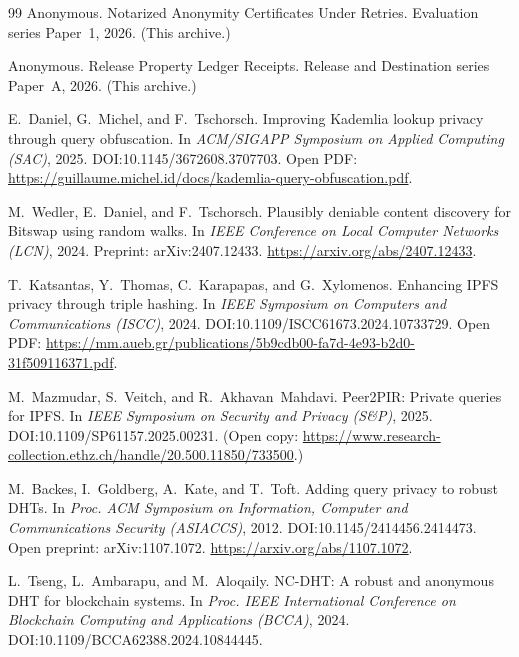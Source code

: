 \documentclass[11pt]{article}
\begin{document}
\begin{thebibliography}{99}
Anonymous.
\newblock Notarized Anonymity Certificates Under Retries.
\newblock Evaluation series Paper~1, 2026. (This archive.)

Anonymous.
\newblock Release Property Ledger Receipts.
\newblock Release and Destination series Paper~A, 2026. (This archive.)

E.~Daniel, G.~Michel, and F.~Tschorsch.
\newblock Improving Kademlia lookup privacy through query obfuscation.
\newblock In \emph{ACM/SIGAPP Symposium on Applied Computing (SAC)}, 2025.
\newblock DOI:10.1145/3672608.3707703.
\newblock Open PDF: \url{https://guillaume.michel.id/docs/kademlia-query-obfuscation.pdf}.

M.~Wedler, E.~Daniel, and F.~Tschorsch.
\newblock Plausibly deniable content discovery for Bitswap using random walks.
\newblock In \emph{IEEE Conference on Local Computer Networks (LCN)}, 2024.
\newblock Preprint: arXiv:2407.12433. \url{https://arxiv.org/abs/2407.12433}.

T.~Katsantas, Y.~Thomas, C.~Karapapas, and G.~Xylomenos.
\newblock Enhancing IPFS privacy through triple hashing.
\newblock In \emph{IEEE Symposium on Computers and Communications (ISCC)}, 2024.
\newblock DOI:10.1109/ISCC61673.2024.10733729.
\newblock Open PDF: \url{https://mm.aueb.gr/publications/5b9cdb00-fa7d-4e93-b2d0-31f509116371.pdf}.


M.~Mazmudar, S.~Veitch, and R.~Akhavan~Mahdavi.
\newblock Peer2PIR: Private queries for IPFS.
\newblock In \emph{IEEE Symposium on Security and Privacy (S\&P)}, 2025.
\newblock DOI:10.1109/SP61157.2025.00231.
\newblock (Open copy: \url{https://www.research-collection.ethz.ch/handle/20.500.11850/733500}.)

M.~Backes, I.~Goldberg, A.~Kate, and T.~Toft.
\newblock Adding query privacy to robust DHTs.
\newblock In \emph{Proc. ACM Symposium on Information, Computer and Communications Security (ASIACCS)}, 2012.
\newblock DOI:10.1145/2414456.2414473.
\newblock Open preprint: arXiv:1107.1072. \url{https://arxiv.org/abs/1107.1072}.


L.~Tseng, L.~Ambarapu, and M.~Aloqaily.
\newblock NC-DHT: A robust and anonymous DHT for blockchain systems.
\newblock In \emph{Proc. IEEE International Conference on Blockchain Computing and Applications (BCCA)}, 2024.
\newblock DOI:10.1109/BCCA62388.2024.10844445.



\end{thebibliography}
\end{document}
